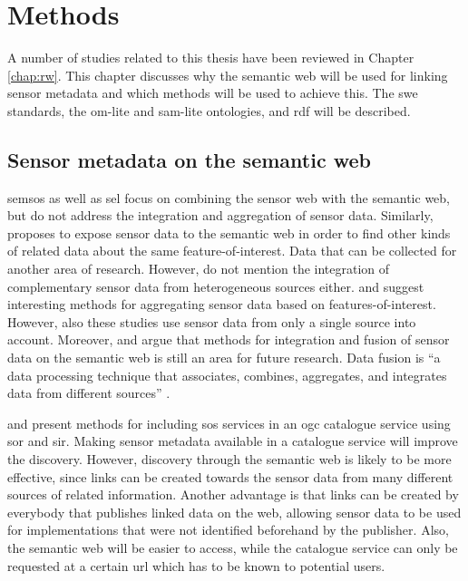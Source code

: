 

\chapter{Methods}
\label{chap:methods}

A number of studies related to this thesis have been reviewed in Chapter \ref{chap:rw}. This chapter discusses why the semantic web will be used for linking sensor metadata and which methods will be used to achieve this. The \ac{swe} standards, the om-lite and sam-lite ontologies, and \ac{rdf} will be described.  

\section{Sensor metadata on the semantic web}
\ac{semsos} \citep{SSW:Henson, SSW:Pschorr} as well as \ac{sel} \citep{SSW:Janowicz} focus on combining the sensor web with the semantic web, but do not address the integration and aggregation of sensor data. Similarly, \cite{SSW:Atkinson} proposes to expose sensor data to the semantic web in order to find other kinds of related data about the same feature-of-interest. Data that can be collected for another area of research. However, \cite{SSW:Atkinson} do not mention the integration of complementary sensor data from heterogeneous sources either. \cite{SSW:Stasch} and \cite{SSW:Stasch3} suggest interesting methods for aggregating sensor data based on features-of-interest. However, also these studies use sensor data from only a single source into account. Moreover, \cite{SSW:Corcho} and \cite{SSW:Ji} argue that methods for integration and fusion of sensor data on the semantic web is still an area for future research. Data fusion is \enquote{a data processing technique that associates, combines, aggregates, and integrates data from different sources} \cite[p. 2]{SSW:Wang2}. 

\cite{SW:OGC3} and \cite{SW:OGC4} present methods for including \ac{sos} services in an \ac{ogc} catalogue service using \ac{sor} and \ac{sir}. Making sensor metadata available in a catalogue service will improve the discovery. However, discovery through the semantic web is likely to be more effective, since links can be created towards the sensor data from many different sources of related information. Another advantage is that links can be created by everybody that publishes linked data on the web, allowing sensor data to be used for implementations that were not identified beforehand by the publisher. Also, the semantic web will be easier to access, while the catalogue service can only be requested at a certain \ac{url} which has to be known to potential users. 

